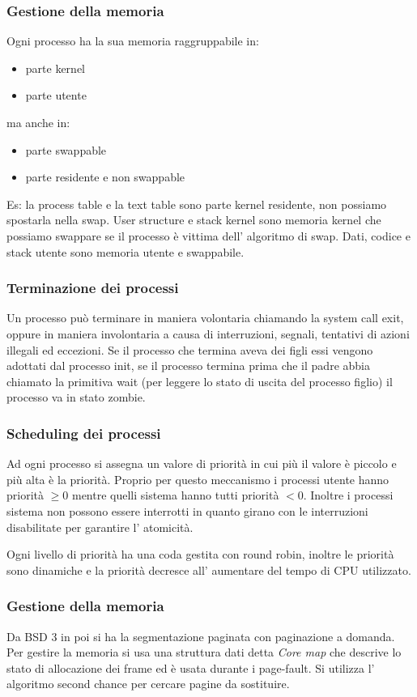 \subsubsection{Gestione della memoria}
Ogni processo ha la sua memoria raggruppabile in:
\begin{itemize}
    \item parte kernel
    \item parte utente
\end{itemize}
ma anche in:
\begin{itemize}
    \item parte swappable
    \item parte residente e non swappable
\end{itemize}
Es: la process table e la text table sono parte kernel residente, non possiamo spostarla nella swap.
User structure e stack kernel sono memoria kernel che possiamo swappare se il processo è vittima dell' algoritmo di swap.
Dati, codice e stack utente sono memoria utente e swappabile.


\subsubsection{Terminazione dei processi}
Un processo può terminare in maniera volontaria chiamando la system call exit, oppure in maniera involontaria a causa di interruzioni, segnali, tentativi di azioni illegali ed eccezioni.
Se il processo che termina aveva dei figli essi vengono adottati dal processo init, se il processo termina prima che il padre abbia chiamato la primitiva wait (per leggere lo stato di uscita del processo figlio) il processo va in stato zombie.


\subsubsection{Scheduling dei processi}
Ad ogni processo si assegna un valore di priorità in cui più il valore è piccolo e più alta è la priorità.
Proprio per questo meccanismo i processi utente hanno priorità $\geq 0$ mentre quelli sistema hanno tutti priorità $ < 0$.
Inoltre i processi sistema non possono essere interrotti in quanto girano con le interruzioni disabilitate per garantire l' atomicità.

Ogni livello di priorità ha una coda gestita con round robin, inoltre le priorità sono dinamiche e la priorità decresce all' aumentare del tempo di CPU utilizzato.


\subsubsection{Gestione della memoria}
Da BSD 3 in poi si ha la segmentazione paginata con paginazione a domanda.
Per gestire la memoria si usa una struttura dati detta \emph{Core map} che descrive lo stato di allocazione dei frame ed è usata durante i page-fault.
Si utilizza l' algoritmo second chance per cercare pagine da sostituire.


